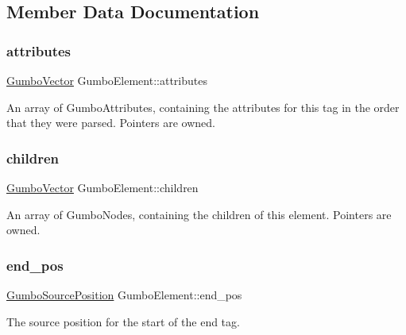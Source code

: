 \subsection{Member Data Documentation}
\mbox{\label{struct_gumbo_element_aab2e879f3ee064cc075a8ffc83cdcfb2}} 
\subsubsection{\texorpdfstring{attributes}{attributes}}
{\footnotesize\ttfamily \mbox{\hyperlink{struct_gumbo_vector}{Gumbo\+Vector}} Gumbo\+Element\+::attributes}

An array of Gumbo\+Attributes, containing the attributes for this tag in the order that they were parsed. Pointers are owned. \mbox{\label{struct_gumbo_element_ade0a04bb1508bb2419958b582710b89b}} 
\subsubsection{\texorpdfstring{children}{children}}
{\footnotesize\ttfamily \mbox{\hyperlink{struct_gumbo_vector}{Gumbo\+Vector}} Gumbo\+Element\+::children}

An array of Gumbo\+Nodes, containing the children of this element. Pointers are owned. \mbox{\label{struct_gumbo_element_af96c28798bcd9c0ac05a93eb4abeffef}} 
\subsubsection{\texorpdfstring{end\+\_\+pos}{end\_pos}}
{\footnotesize\ttfamily \mbox{\hyperlink{struct_gumbo_source_position}{Gumbo\+Source\+Position}} Gumbo\+Element\+::end\+\_\+pos}

The source position for the start of the end tag. \mbox{\label{struct_gumbo_element_a3f23be395bd8c824cedc3f01be1c897b}} 
